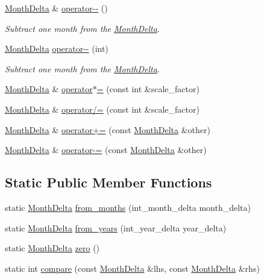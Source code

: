 \begin{DoxyCompactItemize}
\hyperlink{structMonthDelta}{\-Month\-Delta} \& \hyperlink{structMonthDelta_a792c4dd313efad2aec9dc80b7d18dc4e}{operator-\/-\/} ()
\begin{DoxyCompactList}\small\item\em \-Subtract one month from the \hyperlink{structMonthDelta}{\-Month\-Delta}. \end{DoxyCompactList}\item 
\hyperlink{structMonthDelta}{\-Month\-Delta} \hyperlink{structMonthDelta_a57b2bfc986e466491dc6ae5546988de7}{operator-\/-\/} (int)
\begin{DoxyCompactList}\small\item\em \-Subtract one month from the \hyperlink{structMonthDelta}{\-Month\-Delta}. \end{DoxyCompactList}\item 
\hyperlink{structMonthDelta}{\-Month\-Delta} \& \hyperlink{structMonthDelta_a63ed19158fcd7fd743ecb4afb83ff874}{operator$\ast$=} (const int \&scale\-\_\-factor)
\item 
\hyperlink{structMonthDelta}{\-Month\-Delta} \& \hyperlink{structMonthDelta_aa8333e32a1bcd75fd93410574af2ec00}{operator/=} (const int \&scale\-\_\-factor)
\item 
\hyperlink{structMonthDelta}{\-Month\-Delta} \& \hyperlink{structMonthDelta_aa244bc614894a3daaf8d71f0c9c6202b}{operator+=} (const \hyperlink{structMonthDelta}{\-Month\-Delta} \&other)
\item 
\hyperlink{structMonthDelta}{\-Month\-Delta} \& \hyperlink{structMonthDelta_ad62de2e3686f5b93088eb371e9ff4c87}{operator-\/=} (const \hyperlink{structMonthDelta}{\-Month\-Delta} \&other)
\end{DoxyCompactItemize}
\subsection*{\-Static \-Public \-Member \-Functions}
\begin{DoxyCompactItemize}
\item 
static \hyperlink{structMonthDelta}{\-Month\-Delta} \hyperlink{structMonthDelta_afc96dd6ca914abc1ddd067f8f3755a89}{from\-\_\-months} (int\-\_\-month\-\_\-delta month\-\_\-delta)
\item 
static \hyperlink{structMonthDelta}{\-Month\-Delta} \hyperlink{structMonthDelta_a02632b6ef33850d9329bd04a686ce1ed}{from\-\_\-years} (int\-\_\-year\-\_\-delta year\-\_\-delta)
\item 
static \hyperlink{structMonthDelta}{\-Month\-Delta} \hyperlink{structMonthDelta_a847cb9c956c133957dbaffb32fb9bd15}{zero} ()
\item 
static int \hyperlink{structMonthDelta_afb632f08f6278bcf7dfd5aef0cb12322}{compare} (const \hyperlink{structMonthDelta}{\-Month\-Delta} \&lhs, const \hyperlink{structMonthDelta}{\-Month\-Delta} \&rhs)
\end{DoxyCompactItemize}
